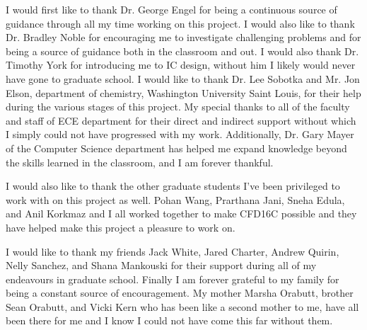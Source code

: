 \documentclass[12pt,oneside,final]{siuethesis}
\theoremstyle{definition}
\begin{document}
\begin{acknowledgements} 

\par I would first like to thank Dr. George Engel for being a continuous source of guidance through all my time working on this project. I would also like to thank Dr. Bradley Noble for encouraging me to investigate challenging problems and for being a source of guidance both in the classroom and out. I would also thank Dr. Timothy York for introducing me to IC design, without him I likely would never have gone to graduate school. I  would  like  to thank  Dr.  Lee  Sobotka  and  Mr.  Jon  Elson,  department  of  chemistry, Washington  University  Saint  Louis,  for  their  help  during  the  various  stages  of  this  project. My  special  thanks  to all of the  faculty  and  staff  of  ECE  department  for  their  direct  and  indirect support without which I simply could not have progressed with my work. Additionally, Dr. Gary Mayer of the Computer Science department has helped me expand knowledge beyond the skills learned in the classroom, and I am forever thankful. 
\par I would also like to thank the other graduate students I've been privileged to work with on this project as well. Pohan Wang, Prarthana Jani, Sneha Edula, and Anil Korkmaz and I all worked together to make CFD16C possible and they have helped make this project a pleasure to work on.
\par I would like to thank my friends Jack White, Jared Charter, Andrew Quirin, Nelly Sanchez, and Shana Mankouski for their support during all of my endeavours in graduate school. Finally I am forever grateful to my family for being a constant source of encouragement. My mother Marsha Orabutt, brother Sean Orabutt, and Vicki Kern who has been like a second mother to me, have all been there for me and I know I could not have come this far without them.

\end{acknowledgements}

\tableofcontents

\cleardoublepage %

\acknowledgements

\cleardoublepage

\listoffigures %

\cleardoublepage

\listoftables

\mainmatter %
\end{document}
